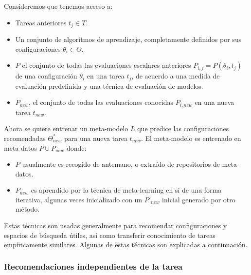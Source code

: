 \begin{definition}
Consideremos que tenemos acceso a:

\begin{itemize}
	\item Tareas anteriores $t_j \in T$.
	\item Un conjunto de algoritmos de aprendizaje, completamente definidos por sus configuraciones $\theta_i \in \Theta$.
	\item $P$ el conjunto de todas las evaluaciones escalares anteriores $P_{i,j} = P(\theta_i, t_j)$ de una configuración $\theta_i$ en una tarea $t_j$, de acuerdo a una medida de evaluación predefinida y una técnica de evaluación de modelos. 
	\item $P_{new}$, el conjunto de todas las evaluaciones conocidas $P_{i, new}$ en una nueva tarea $t_{new}$.
\end{itemize}

Ahora se quiere entrenar un meta-modelo $L$ que predice las configuraciones recomendadas $\Theta^*_{new}$ para una nueva tarea $t_{new}$. El meta-modelo es entrenado en meta-datos $P\cup P_{new}$ donde:

\begin{itemize}
	\item $P$ usualmente es recogido de antemano, o extraído de repositorios de meta-datos.
	\item $P_{new}$ es aprendido por la técnica de meta-learning en sí de una forma iterativa, algunas veces inicializado con un $P'_{new}$ inicial generado por otro método.
\end{itemize}
\end{definition}

Estas técnicas son usadas generalmente para recomendar configuraciones y espacios de búsqueda útiles, así como transferir conocimiento de tareas empíricamente similares. Algunas de estas técnicas son explicadas a continuación. 

\subsubsection{Recomendaciones independientes de la tarea}

